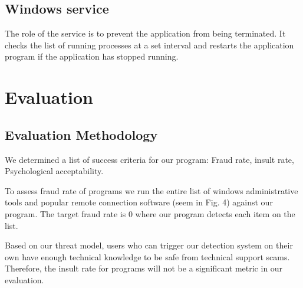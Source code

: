 \documentclass[final]{IEEEtran}
\begin{document}
\subsection{Windows service}
The role of the service is to prevent the application from being terminated. It checks the list of running processes at a set interval and restarts the application program if the application has stopped running.

\section{Evaluation} %
%




\subsection{Evaluation Methodology}

We determined a list of success criteria for our program: Fraud rate, insult rate, Psychological acceptability.

To assess fraud rate of programs we run the entire list of windows administrative tools and popular remote connection software (seem in Fig. 4) against our program. The target fraud rate is 0 where our program detects each item on the list.

Based on our threat model, users who can trigger our detection system on their own have enough technical knowledge to be safe from technical support scams. Therefore, the insult rate for programs will not be a significant metric in our evaluation. 
\end{document}
